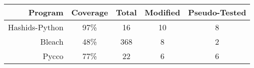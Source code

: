 \renewcommand{\arraystretch}{1.2}

\begin{table}[H]
\centering

\huge

\begin{tabular}{rcccc}


  Program & Coverage & Total & Modified & Pseudo-Tested \\
  \toprule

  Hashids-Python & 97\% & 16 & 10 & 8 \\

  Bleach & 48\% & 368 & 8 & 2 \\

  Pycco & 77\% & 22 & 6 & 6 \\









  \bottomrule

\end{tabular}


\end{table}
